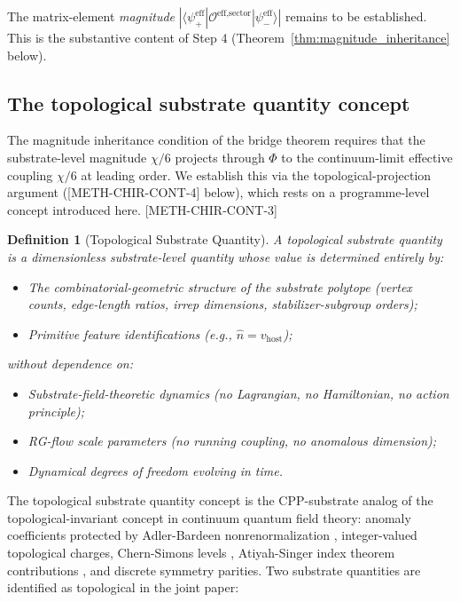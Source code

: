 \documentclass[11pt,letterpaper]{article}
\newtheorem{definition}[theorem]{Definition}
\newcommand{\methref}[1]{\textsf{\small[\textsc{#1}]}}
\begin{document}
The matrix-element \emph{magnitude} $|\langle\psi^{\text{eff}}_+|\mathcal{O}^{\text{eff,sector}}|\psi^{\text{eff}}_-\rangle|$ remains to be established. This is the substantive content of Step 4 (Theorem~\ref{thm:magnitude_inheritance} below).

\subsection{The topological substrate quantity concept}
\label{sec:topological_substrate}

The magnitude inheritance condition of the bridge theorem requires that the substrate-level magnitude $\chi/6$ projects through $\Phi$ to the continuum-limit effective coupling $\chi/6$ at leading order. We establish this via the topological-projection argument (\methref{METH-CHIR-CONT-4} below), which rests on a programme-level concept introduced here. \methref{METH-CHIR-CONT-3}

\begin{definition}[Topological Substrate Quantity]
\label{def:topological_substrate}
A \emph{topological substrate quantity} is a dimensionless substrate-level quantity whose value is determined entirely by:
\begin{itemize}[leftmargin=*]
\item The combinatorial-geometric structure of the substrate polytope (vertex counts, edge-length ratios, irrep dimensions, stabilizer-subgroup orders);
\item Primitive feature identifications (e.g., $\hat{n} = v_{\text{host}}$);
\end{itemize}
\emph{without dependence on}:
\begin{itemize}[leftmargin=*]
\item Substrate-field-theoretic dynamics (no Lagrangian, no Hamiltonian, no action principle);
\item RG-flow scale parameters (no running coupling, no anomalous dimension);
\item Dynamical degrees of freedom evolving in time.
\end{itemize}
\end{definition}

The topological substrate quantity concept is the CPP-substrate analog of the topological-invariant concept in continuum quantum field theory: anomaly coefficients protected by Adler-Bardeen nonrenormalization \cite{AdlerBardeen}, integer-valued topological charges, Chern-Simons levels \cite{Witten1983CS}, Atiyah-Singer index theorem contributions \cite{AtiyahSinger}, and discrete symmetry parities. Two substrate quantities are identified as topological in the joint paper:
\end{document}
